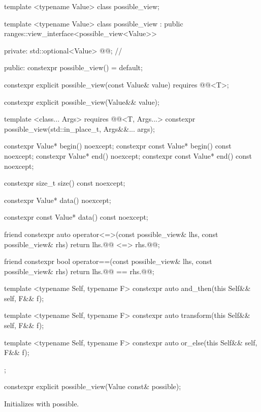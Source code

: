 \begin{codeblock}

template <typename Value>
class possible_view;


template <typename Value>
class possible_view : public ranges::view_interface<possible_view<Value>> {
  private:
    std::optional<Value> @@;             // \expos{}

  public:
    constexpr possible_view() = default;

    constexpr explicit possible_view(const Value& value) requires @@<T>;

    constexpr explicit possible_view(Value&& value);

    template <class... Args>
      requires @@<T, Args...>
    constexpr possible_view(std::in_place_t, Args&&... args);

    constexpr Value*       begin() noexcept;
    constexpr const Value* begin() const noexcept;
    constexpr Value*       end() noexcept;
    constexpr const Value* end() const noexcept;

    constexpr size_t size() const noexcept;

    constexpr Value* data() noexcept;

    constexpr const Value* data() const noexcept;

    friend constexpr auto operator<=>(const possible_view& lhs,
    const possible_view& rhs) {
      return lhs.@@ <=> rhs.@@;
    }

    friend constexpr bool operator==(const possible_view& lhs,
    const possible_view& rhs) {
      return lhs.@@ == rhs.@@;
    }

    template <typename Self, typename F>
    constexpr auto and_then(this Self&& self, F&& f);

    template <typename Self, typename F>
    constexpr auto transform(this Self&& self, F&& f);

    template <typename Self, typename F>
    constexpr auto or_else(this Self&& self, F&& f);
};

\end{codeblock}

\begin{itemdecl}
  constexpr explicit possible_view(Value const& possible);
\end{itemdecl}
\begin{itemdescr}
\pnum{}
\effects{}
Initializes  with possible.
\end{itemdescr}

